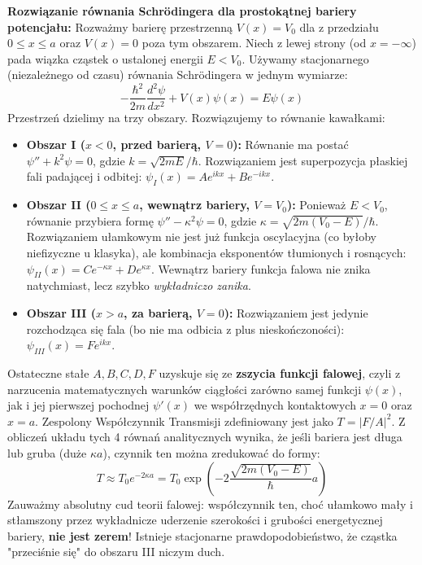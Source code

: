 \documentclass[11pt, a4paper]{article}
\begin{document}
\textbf{Rozwiązanie równania Schrödingera dla prostokątnej bariery potencjału:}
Rozważmy barierę przestrzenną $V(x) = V_0$ dla z przedziału $0 \le x \le a$ oraz $V(x) = 0$ poza tym obszarem. Niech z lewej strony (od $x=-\infty$) pada wiązka cząstek o ustalonej energii $E < V_0$. Używamy stacjonarnego (niezależnego od czasu) równania Schrödingera w jednym wymiarze:
\[
-\frac{\hbar^2}{2m} \frac{d^2\psi}{dx^2} + V(x)\psi(x) = E\psi(x)
\]
Przestrzeń dzielimy na trzy obszary. Rozwiązujemy to równanie kawałkami:
\begin{itemize}
    \item \textbf{Obszar I ($x < 0$, przed barierą, $V=0$):} Równanie ma postać $\psi'' + k^2\psi = 0$, gdzie $k = \sqrt{2mE}/\hbar$. Rozwiązaniem jest superpozycja płaskiej fali padającej i odbitej: $\psi_I(x) = A e^{ikx} + B e^{-ikx}$.
    \item \textbf{Obszar II ($0 \le x \le a$, wewnątrz bariery, $V=V_0$):} Ponieważ $E < V_0$, równanie przybiera formę $\psi'' - \kappa^2\psi = 0$, gdzie $\kappa = \sqrt{2m(V_0 - E)}/\hbar$. Rozwiązaniem ułamkowym nie jest już funkcja oscylacyjna (co byłoby niefizyczne u klasyka), ale kombinacja eksponentów tłumionych i rosnących: $\psi_{II}(x) = C e^{-\kappa x} + D e^{\kappa x}$. Wewnątrz bariery funkcja falowa nie znika natychmiast, lecz szybko \textit{wykładniczo zanika}.
    \item \textbf{Obszar III ($x > a$, za barierą, $V=0$):} Rozwiązaniem jest jedynie rozchodząca się fala (bo nie ma odbicia z plus nieskończoności): $\psi_{III}(x) = F e^{ikx}$.
\end{itemize}

Ostateczne stałe $A, B, C, D, F$ uzyskuje się ze \textbf{zszycia funkcji falowej}, czyli z narzucenia matematycznych warunków ciągłości zarówno samej funkcji $\psi(x)$, jak i jej pierwszej pochodnej $\psi'(x)$ we współrzędnych kontaktowych $x=0$ oraz $x=a$. Zespolony Współczynnik Transmisji zdefiniowany jest jako $T = |F/A|^2$. Z obliczeń układu tych 4 równań analitycznych wynika, że jeśli bariera jest długa lub gruba (duże $\kappa a$), czynnik ten można zredukować do formy:
\[
T \approx T_0 e^{-2\kappa a} = T_0 \exp\left( -2\frac{\sqrt{2m(V_0 - E)}}{\hbar} a \right)
\]
Zauważmy absolutny cud teorii falowej: współczynnik ten, choć ułamkowo mały i stłamszony przez wykładnicze uderzenie szerokości i grubości energetycznej bariery, \textbf{nie jest zerem}! Istnieje stacjonarne prawdopodobieństwo, że cząstka "przeciśnie się" do obszaru III niczym duch.
\end{document}
